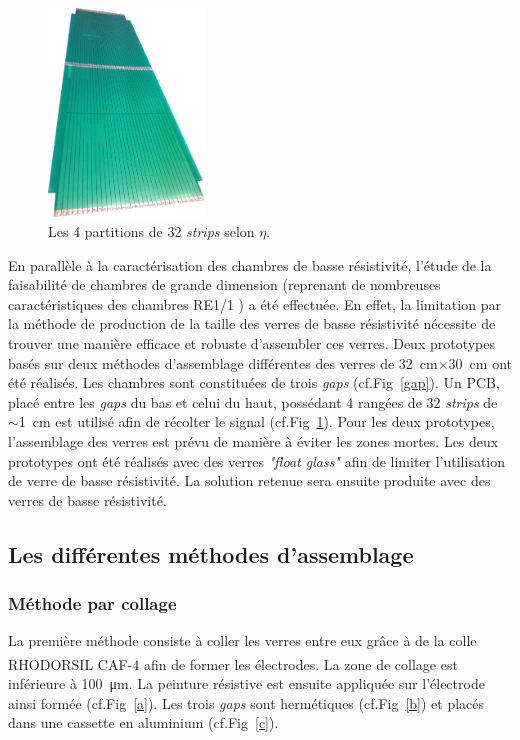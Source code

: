 \begin{figure}
	\vspace*{-1cm}
	\centering
	\includegraphics[width=0.37\textwidth]{GLA/strips.jpg}
	\caption{Les \num{4} partitions de \num{32} \textit{strips} selon $\eta$.}
	\label{strips}
\end{figure}

En parallèle à la caractérisation des chambres de basse résistivité, l'étude de la faisabilité de chambres de grande dimension (reprenant de nombreuses caractéristiques des chambres RE1/1 \cite{gapss}) a été effectuée. En effet, la limitation par la méthode de production de la taille des verres de basse résistivité nécessite de trouver une manière efficace et robuste d'assembler ces verres.  Deux prototypes basés sur deux méthodes d'assemblage différentes des verres de \SI{32}{\centi\meter}$\times$\SI{30}{\centi\meter} ont été réalisés. Les chambres sont constituées de trois \textit{gaps} (cf.Fig~\ref{gap}). Un PCB, placé entre les \textit{gaps} du bas et celui du haut, possédant \num{4} rangées de \num{32} \textit{strips} de $\sim$\SI{1}{\centi\meter} est utilisé afin de récolter le signal (cf.Fig~\ref{strips}). Pour les deux prototypes, l'assemblage des verres est prévu de manière à éviter les zones mortes. Les deux prototypes ont été réalisés avec des verres \textit{"float glass"} afin de limiter l'utilisation de verre de basse résistivité. La solution retenue sera ensuite produite avec des verres de basse résistivité.

\subsection{Les différentes méthodes d'assemblage} 
\subsubsection{Méthode par collage}
La première méthode consiste à coller les verres entre eux grâce à de la colle RHODORSIL\textsuperscript{\textregistered}
 CAF-4 afin de former les électrodes. La zone de collage est inférieure à \SI{100}{\micro\meter}. La peinture résistive est ensuite appliquée sur l'électrode ainsi formée (cf.Fig~\ref{a}). Les trois \textit{gaps} sont hermétiques (cf.Fig~\ref{b}) et placés dans une cassette en aluminium (cf.Fig~\ref{c}).
 

